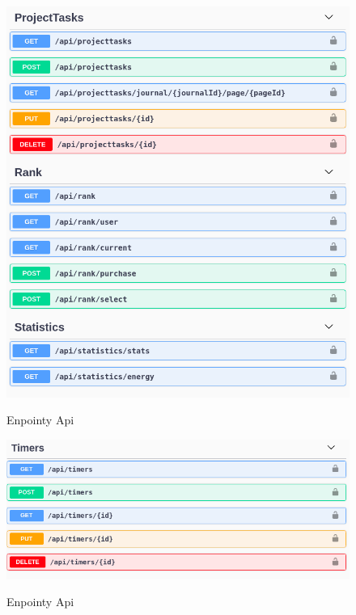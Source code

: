 \documentclass[a4paper,11pt]{report}
\begin{document}
\begin{figure}[H]
	\centering
	\includegraphics[scale=0.5]{implementacja/backend/projectTasks_rank_statistics_api}\\
	\caption{Enpointy Api}
	\label{fig:projectTasks_rank_statistics_api}
\end{figure}
\begin{figure}[H]
	\centering
	\includegraphics[scale=0.5]{implementacja/backend/timers_api}\\
	\caption{Enpointy Api}
	\label{fig:timers_api}
\end{figure}
\end{document}
